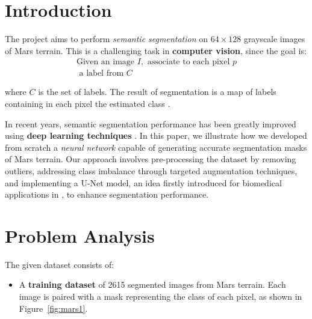 \documentclass[11pt]{article}
\begin{document}
    \begin{multicols*}{2}


    \section{Introduction} %
    \label{sec:introduction}
    
    The project aims to perform \emph{semantic segmentation} on \(64 \times 128\) grayscale images of Mars terrain. This is a challenging task in \textbf{computer vision}, since the goal is:
    \begin{equation*}
    \boxed{
    \begin{gathered}
    \text{Given an image }I,\text{ associate to each pixel }p \\
    \text{ a label from }C 
    \end{gathered}
    }
    \end{equation*}

    \noindent where $C$ is the set of labels. The result of segmentation is a map of labels containing in each pixel the estimated class \cite{SSslide}.

    In recent years, semantic segmentation performance has been greatly improved using \textbf{deep learning techniques} \cite{semsegm}. In this paper, we illustrate how we developed from scratch a \emph{neural network} capable of generating accurate segmentation masks of Mars terrain. Our approach involves pre-processing the dataset by removing outliers, addressing class imbalance through targeted augmentation techniques, and implementing a U-Net model, an idea firstly introduced for biomedical applications in \cite{originalUnet}, to enhance segmentation performance.
    

    \section{Problem Analysis} %
    \label{sec:problem_analysis}
    
    The given dataset consists of:
    \begin{itemize}
        \item A \textbf{training dataset} of 2615 segmented images from Mars terrain. Each image is paired with a mask representing the class of each pixel, as shown in Figure~\ref{fig:mars1}.


\end{itemize}
\end{multicols*}
\end{document}
